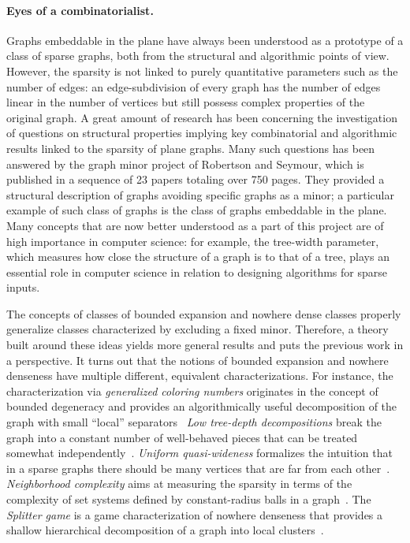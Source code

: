 \paragraph*{Eyes of a combinatorialist.}
Graphs embeddable in the plane have always been understood as a prototype of a class of sparse graphs,
both from the structural and algorithmic points of view.
However, the sparsity is not linked to purely quantitative parameters such as the number of edges:
an edge-subdivision of every graph has the number of edges linear in the number of vertices
but still possess complex properties of the original graph.
A great amount of research has been concerning the investigation of questions on structural properties
implying key combinatorial and algorithmic results linked to the sparsity of plane graphs.
Many such questions has been answered by the graph minor project of Robertson and Seymour,
which is published in a sequence of 23 papers totaling over 750 pages.
They provided a structural description of graphs avoiding specific graphs as a minor;
a particular example of such class of graphs is the class of graphs embeddable in the plane.
Many concepts that are now better understood as a part of this project are of high importance in computer science:
for example, the tree-width parameter, which measures how close the structure of a graph is to that of a tree,
plays an essential role in computer science in relation to designing algorithms for sparse inputs.

The concepts of classes of bounded expansion and nowhere dense classes properly generalize classes characterized by excluding a fixed minor.
Therefore, a theory built around these ideas yields more general results and puts the previous work in a perspective.
It turns out that the notions of bounded expansion and nowhere denseness have multiple different, equivalent characterizations.
For instance, the characterization via {\em{generalized coloring numbers}} originates in the concept of bounded degeneracy and provides an algorithmically useful decomposition of the graph with small ``local''
separators~\cite{Zhu09}
{\em{Low tree-depth decompositions}} break the graph into a constant number of well-behaved pieces that can be treated somewhat independently~\cite{NesetrilM08a}.
{\em{Uniform quasi-wideness}} formalizes the intuition that in a sparse graphs there should be many vertices that are far from each other~\cite{nevsetvril2010first}.
{\em{Neighborhood complexity}} aims at measuring the sparsity in terms of the complexity of set systems defined by constant-radius balls in a graph~\cite{ReidlVS19}.
The {\em{Splitter game}} is a game characterization of nowhere denseness that provides a shallow hierarchical decomposition of a graph into local clusters~\cite{grohe2017deciding}.

